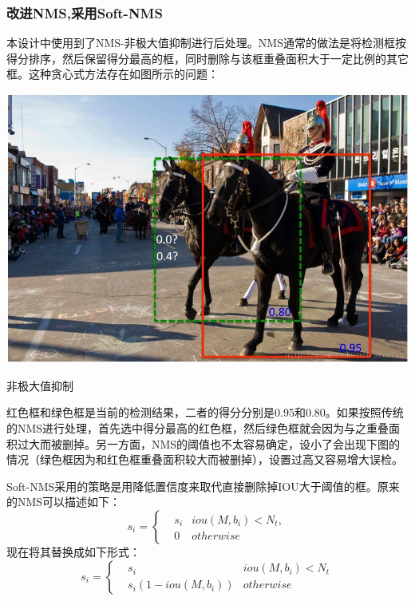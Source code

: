 \subsubsection{改进NMS,采用Soft-NMS}
本设计中使用到了NMS-非极大值抑制\cite{soft-nms}进行后处理。NMS通常的做法是将检测框按得分排序，然后保留得分最高的框，同时删除与该框重叠面积大于一定比例的其它框。这种贪心式方法存在如图所示的问题： 
\begin{uscfigure}
	\includegraphics[width=\textwidth]{./Pictures/soft-nms.jpeg}	
	\caption{非极大值抑制}
	\label{soft-nms}
\end{uscfigure}
红色框和绿色框是当前的检测结果，二者的得分分别是0.95和0.80。如果按照传统的NMS进行处理，首先选中得分最高的红色框，然后绿色框就会因为与之重叠面积过大而被删掉。另一方面，NMS的阈值也不太容易确定，设小了会出现下图的情况（绿色框因为和红色框重叠面积较大而被删掉），设置过高又容易增大误检。

Soft-NMS采用的策略是用降低置信度来取代直接删除掉IOU大于阈值的框。原来的NMS可以描述如下：
\begin{equation}
s_i=\left\{
\begin{aligned}
& s_i 	&iou(M,b_i) < N_t,\\
& 0 	&otherwise
\end{aligned}
\right.
\end{equation}
现在将其替换成如下形式：
\begin{equation}
s_i=\left\{
\begin{aligned}
& s_i 	&iou(M, b_i) < N_t\\
& s_i(1 - iou(M, b_i)) 	&otherwise
\end{aligned}
\right.
\end{equation}